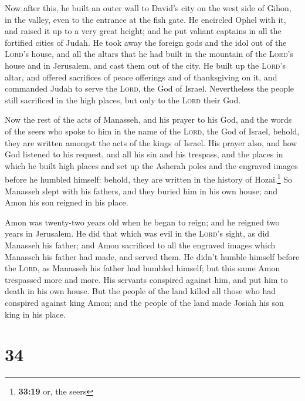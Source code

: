  Now after this, he built an outer wall to David's city
on the west side of Gihon, in the valley, even to the entrance at the
fish gate. He encircled Ophel with it, and raised it up to a very great
height; and he put valiant captains in all the fortified cities of
Judah.  He took away the foreign gods and the idol out of
the \textsc{Lord}'s house, and all the altars that he had built in the
mountain of the \textsc{Lord}'s house and in Jerusalem, and cast them
out of the city.  He built up the \textsc{Lord}'s altar,
and offered sacrifices of peace offerings and of thanksgiving on it, and
commanded Judah to serve the \textsc{Lord}, the God of Israel.
 Nevertheless the people still sacrificed in the high
places, but only to the \textsc{Lord} their God.

 Now the rest of the acts of Manasseh, and his prayer to
his God, and the words of the seers who spoke to him in the name of the
\textsc{Lord}, the God of Israel, behold, they are written amongst the
acts of the kings of Israel.  His prayer also, and how
God listened to his request, and all his sin and his trespass, and the
places in which he built high places and set up the Asherah poles and
the engraved images before he humbled himself: behold, they are written
in the history of Hozai.\footnote{\textbf{33:19} or, the seers}
 So Manasseh slept with his fathers, and they buried him
in his own house; and Amon his son reigned in his place.

 Amon was twenty-two years old when he began to reign;
and he reigned two years in Jerusalem.  He did that which
was evil in the \textsc{Lord}'s sight, as did Manasseh his father; and
Amon sacrificed to all the engraved images which Manasseh his father had
made, and served them.  He didn't humble himself before
the \textsc{Lord}, as Manasseh his father had humbled himself; but this
same Amon trespassed more and more.  His servants
conspired against him, and put him to death in his own house.
 But the people of the land killed all those who had
conspired against king Amon; and the people of the land made Josiah his
son king in his place.

\hypertarget{section-33}{%
\section{34}\label{section-33}}

